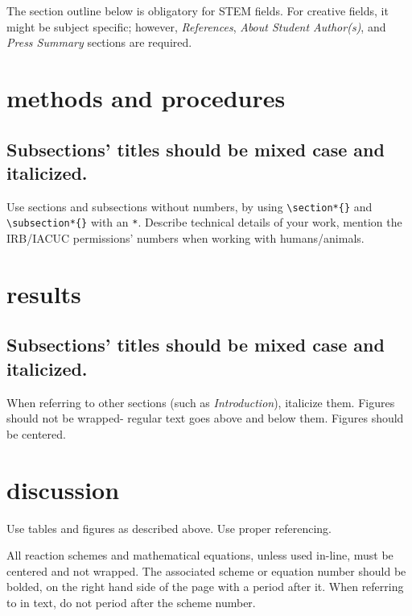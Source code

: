 \documentclass[10pt]{article}
\begin{document}
The section outline below is obligatory for STEM fields. For creative fields, it might be subject specific; however, \textit{References}, \textit{About Student Author(s)}, and \textit{Press Summary} sections are required.


\section*{methods and procedures}

\subsection*{Subsections' titles should be mixed case and italicized.}
Use sections and subsections without numbers, by using \verb+\section*{}+ and \verb+\subsection*{}+ with an \verb+*+. Describe technical details of your work,\cite{journal,chapters} mention the IRB/IACUC permissions' numbers when working with humans/animals.

\section*{results}
\subsection*{Subsections' titles should be mixed case and italicized.}
When referring to other sections (such as \textit{Introduction}), italicize them. Figures should not be wrapped- regular text goes above and below them. Figures should be centered.


\section*{discussion}
Use tables and figures as described above. Use proper referencing.\cite{web}

All reaction schemes and mathematical equations, unless used in-line, must be centered and not wrapped. The associated scheme or equation number should be bolded, on the right hand side of the page with a period after it. When referring to  in text, do not period after the scheme number.
\end{document}

